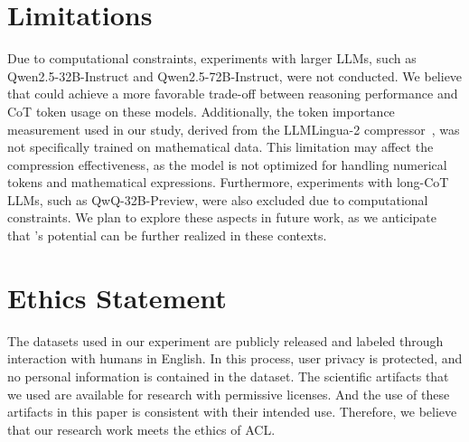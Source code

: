 \section*{Limitations}
\label{subsec:limitation} 

Due to computational constraints, experiments with larger LLMs, such as Qwen2.5-32B-Instruct and Qwen2.5-72B-Instruct, were not conducted. We believe that \method could achieve a more favorable trade-off between reasoning performance and CoT token usage on these models. Additionally, the token importance measurement used in our study, derived from the LLMLingua-2 compressor~\cite{pan:2024llmlingua2}, was not specifically trained on mathematical data. This limitation may affect the compression effectiveness, as the model is not optimized for handling numerical tokens and mathematical expressions. Furthermore, experiments with long-CoT LLMs, such as QwQ-32B-Preview, were also excluded due to computational constraints. We plan to explore these aspects in future work, as we anticipate that \method’s potential can be further realized in these contexts.

\section*{Ethics Statement}
\label{subsec:ethics} 
The datasets used in our experiment are publicly released and labeled through interaction with humans in English. In this process, user privacy is protected, and no personal information is contained in the dataset. The scientific artifacts that we used are available for research with permissive licenses. And the use of these artifacts in this paper is consistent with their intended use. Therefore, we believe that our research work meets the ethics of ACL. 
